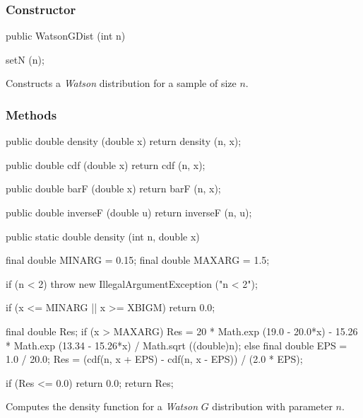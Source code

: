 \subsubsection* {Constructor}

\begin{code}

   public WatsonGDist (int n)\begin{hide} {
      setN (n);
   }\end{hide}
\end{code}
\begin{tabb}
   Constructs a {\em Watson\/} distribution for a sample of size $n$.
\end{tabb}

\subsubsection* {Methods}

\begin{code}\begin{hide}

   public double density (double x) {
      return density (n, x);
   }

   public double cdf (double x) {
      return cdf (n, x);
   }

   public double barF (double x) {
      return barF (n, x);
   }

   public double inverseF (double u) {
      return inverseF (n, u);
   }\end{hide}

   public static double density (int n, double x)\begin{hide} {
      final double MINARG = 0.15;
      final double MAXARG = 1.5;

      if (n < 2)
        throw new IllegalArgumentException ("n < 2");

      if (x <= MINARG || x >= XBIGM)
         return 0.0;

      final double Res;
      if (x > MAXARG)
         Res = 20 * Math.exp (19.0 - 20.0*x) 
            - 15.26 * Math.exp (13.34 - 15.26*x) / Math.sqrt ((double)n);
      else {
         final double EPS = 1.0 / 20.0;
         Res = (cdf(n, x + EPS) - cdf(n, x - EPS)) / (2.0 * EPS);
      }

      if (Res <= 0.0)
         return 0.0;
      return Res;
   }\end{hide}
\end{code}
\begin{tabb} Computes the density function
  for a {\em Watson\/} $G$ distribution with parameter $n$.
\end{tabb}

